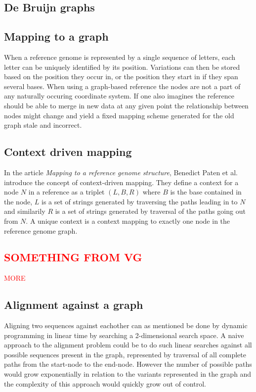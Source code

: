 \documentclass[thesis.tex]{subfiles}
\begin{document}
\subsection{De Bruijn graphs}
\subsection{Mapping to a graph}
When a reference genome is represented by a single sequence of letters, each letter can be uniquely identified by its position. Variations can then be stored based on the position they occur in, or the position they start in if they span several bases. When using a graph-based reference the nodes are not a part of any naturally occuring coordinate system. If one also imagines the reference should be able to merge in new data at any given point the relationship between nodes might change and yield a fixed mapping scheme generated for the old graph stale and incorrect.
\subsection{Context driven mapping}
In the article \textit{Mapping to a reference genome structure}\cite{mapping_to_a_reference_genome_structure}, Benedict Paten et al. introduce the concept of context-driven mapping. They define a context for a node $N$ in a reference as a triplet $(L, B, R)$ where $B$ is the base contained in the node, $L$ is a set of strings generated by traversing the paths leading in to $N$ and similarily $R$ is a set of strings generated by traversal of the paths going out from $N$. A unique context is a context mapping to exactly one node in the reference genome graph.
\subsection{\textcolor{red}{SOMETHING FROM VG}}

\textcolor{red}{MORE}
\subsection{Alignment against a graph}
Aligning two sequences against eachother can as mentioned be done by dynamic programming in linear time by searching a 2-dimensional search space. A naive approach to the alignment problem could be to do such linear searches against all possible sequences present in the graph, represented by traversal of all complete paths from the start-node to the end-node. However the number of possible paths would grow exponentially in relation to the variants represented in the graph and the complexity of this approach would quickly grow out of control. 
\end{document}
